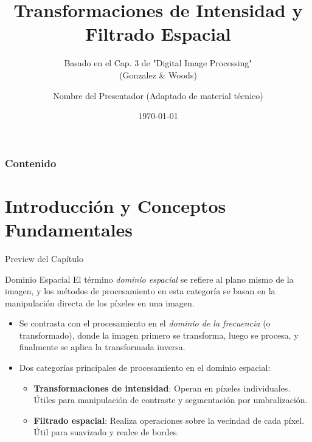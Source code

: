 \documentclass{beamer}
\title{Transformaciones de Intensidad y Filtrado Espacial}
\subtitle{Basado en el Cap. 3 de "Digital Image Processing" \\ (Gonzalez \& Woods)}
\author{Nombre del Presentador  \small{(Adaptado de material técnico)}}
\institute{Universidad / Institución}
\date{\today}
\begin{document}
\begin{frame}
    \titlepage
\end{frame}

\begin{frame}
    \frametitle{Contenido}
    \tableofcontents
\end{frame}

\section{Introducción y Conceptos Fundamentales}

\begin{frame}{Preview del Capítulo}
    \begin{block}{Dominio Espacial}
        El término \textit{dominio espacial} se refiere al plano mismo de la imagen, y los métodos de procesamiento en esta categoría se basan en la manipulación directa de los píxeles en una imagen.
    \end{block}
    \begin{itemize}
        \item Se contrasta con el procesamiento en el \textit{dominio de la frecuencia} (o transformado), donde la imagen primero se transforma, luego se procesa, y finalmente se aplica la transformada inversa.
        \item Dos categorías principales de procesamiento en el dominio espacial:
        \begin{itemize}
            \item \textbf{Transformaciones de intensidad}: Operan en píxeles individuales. Útiles para manipulación de contraste y segmentación por umbralización.
            \item \textbf{Filtrado espacial}: Realiza operaciones sobre la vecindad de cada píxel. Útil para suavizado y realce de bordes.
        \end{itemize}
    \end{itemize}
\end{frame}
\end{document}

